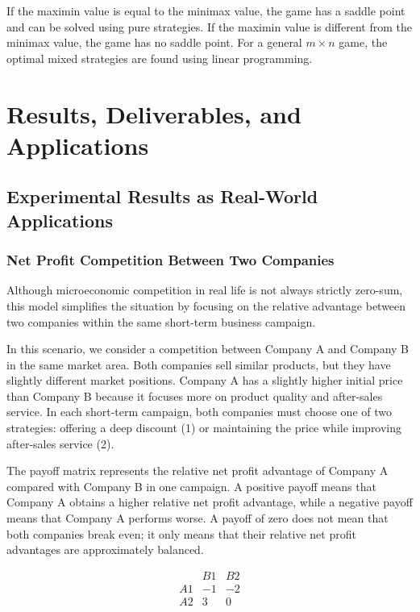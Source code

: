 \documentclass[12pt,a4paper]{article}
\begin{document}
If the maximin value is equal to the minimax value, the game has a saddle point and can be solved using pure strategies. If the maximin value is different from the minimax value, the game has no saddle point. For a general \(m \times n\) game, the optimal mixed strategies are found using linear programming.

\section{Results, Deliverables, and Applications}
\subsection{Experimental Results as Real-World Applications}

\subsubsection{Net Profit Competition Between Two Companies}

Although microeconomic competition in real life is not always strictly zero-sum, this model simplifies the situation by focusing on the relative advantage between two companies within the same short-term business campaign.

In this scenario, we consider a competition between Company A and Company B in the same market area. Both companies sell similar products, but they have slightly different market positions. Company A has a slightly higher initial price than Company B because it focuses more on product quality and after-sales service. In each short-term campaign, both companies must choose one of two strategies: offering a deep discount (1) or maintaining the price while improving after-sales service (2).

The payoff matrix represents the relative net profit advantage of Company A compared with Company B in one campaign. A positive payoff means that Company A obtains a higher relative net profit advantage, while a negative payoff means that Company A performs worse. A payoff of zero does not mean that both companies break even; it only means that their relative net profit advantages are approximately balanced.

\begingroup
\small
\renewcommand{\arraystretch}{0.75}
\setlength{\arraycolsep}{4pt}
\[
\begin{array}{c|cc}
 & B1 & B2\\
\hline
A1 & -1 & -2 \\
A2 & 3 & 0
\end{array}
\]
\endgroup
\end{document}
